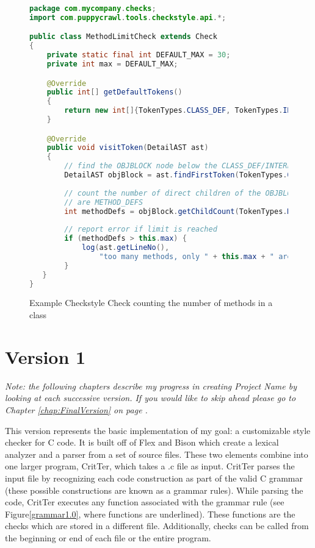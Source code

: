 \documentclass[12pt]{report}
\newcommand{\todoin}{\todo[inline]}
\def\lstlistingname{Figure}
\newcommand{\refCode}{\lstlistingname \hspace{1mm}}
\newcommand{\projectname}{Project Name\xspace}
\newcommand{\programName}{CritTer\xspace}
\begin{document}
\begin{figure}
\caption[Example Checkstyle Check]{Example Checkstyle Check counting the number of methods in 
a class}
\label{checkstyle-rule}
\begin{lstlisting}[language=Java]
package com.mycompany.checks;
import com.puppycrawl.tools.checkstyle.api.*;

public class MethodLimitCheck extends Check
{
    private static final int DEFAULT_MAX = 30;
    private int max = DEFAULT_MAX;

    @Override
    public int[] getDefaultTokens()
    {
        return new int[]{TokenTypes.CLASS_DEF, TokenTypes.INTERFACE_DEF};
    }

    @Override
    public void visitToken(DetailAST ast)
    {
        // find the OBJBLOCK node below the CLASS_DEF/INTERFACE_DEF
        DetailAST objBlock = ast.findFirstToken(TokenTypes.OBJBLOCK);
        
        // count the number of direct children of the OBJBLOCK that 
        // are METHOD_DEFS
        int methodDefs = objBlock.getChildCount(TokenTypes.METHOD_DEF);
        
        // report error if limit is reached
        if (methodDefs > this.max) {
            log(ast.getLineNo(),
                "too many methods, only " + this.max + " are allowed");
        }
   }
}
\end{lstlisting}
\end{figure}


\chapter{Version 1}

\begin{singlespace}
\textit{Note: the following chapters describe my progress in creating \projectname by looking at each 
successive version. If you would like to skip ahead please go to Chapter \ref{chap:FinalVersion} on 
page \pageref{chap:FinalVersion}.} \end{singlespace}
\vspace{3mm} 

This version represents the basic implementation of my goal: a customizable style checker for C code.
It is built off of Flex and Bison which create a lexical analyzer and a parser from a set of source 
files. These two elements combine into one larger program, \programName, which takes a .c file as 
input.  \programName parses the input file by recognizing each code construction as part of the valid 
C grammar (these possible constructions are known as a grammar rules). While parsing the code, 
\programName executes any function associated with the grammar rule (see \refCode \ref{grammar1.0}, 
where functions are underlined). These functions are the checks which are stored in a different file. 
Additionally, checks can be called from the beginning or end of each file or the entire program.
\todoin{mention begin/end of file/program calls}
\end{document}
